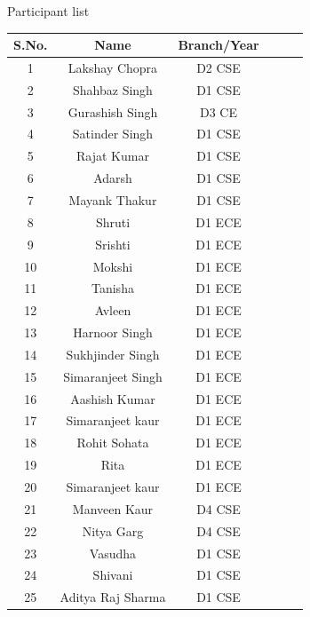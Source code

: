 \documentclass[12pt, a4 paper]{article}
\begin{document}
\begin{center}
\huge Participant list
\end{center}

\begin{table}[h!]
  \begin{center}
    \begin{tabular}{|c|c|c|c|c|c|} 
    \toprule %
      \textbf{S.No.} & \textbf{Name} & \textbf{Branch/Year} \\
      \midrule %
      1 & Lakshay Chopra    & D2 CSE \\          
      2 & Shahbaz Singh     & D1 CSE \\         
      3 & Gurashish Singh   & D3 CE  \\   
      4 & Satinder Singh    & D1 CSE \\
      5 & Rajat Kumar       & D1 CSE \\
      6 & Adarsh            & D1 CSE \\
      7 & Mayank Thakur     & D1 CSE \\
      8 & Shruti            & D1 ECE \\
      9 & Srishti           & D1 ECE \\
     10 & Mokshi            & D1 ECE \\
     11 & Tanisha           & D1 ECE \\
     12 & Avleen            & D1 ECE \\
     13 & Harnoor Singh     & D1 ECE \\
     14 & Sukhjinder Singh  & D1 ECE \\
     15 & Simaranjeet Singh & D1 ECE \\
     16 & Aashish Kumar     & D1 ECE \\
     17 & Simaranjeet kaur  & D1 ECE \\
     18 & Rohit Sohata      & D1 ECE \\
     19 & Rita              & D1 ECE \\
     20 & Simaranjeet kaur  & D1 ECE \\
     21 & Manveen Kaur      & D4 CSE \\
     22 & Nitya Garg        & D4 CSE \\
     23 & Vasudha           & D1 CSE \\
     24 & Shivani           & D1 CSE \\
     25 & Aditya Raj Sharma & D1 CSE \\

      \bottomrule %
    \end{tabular}
  \end{center}
\end{table}
\end{document}
